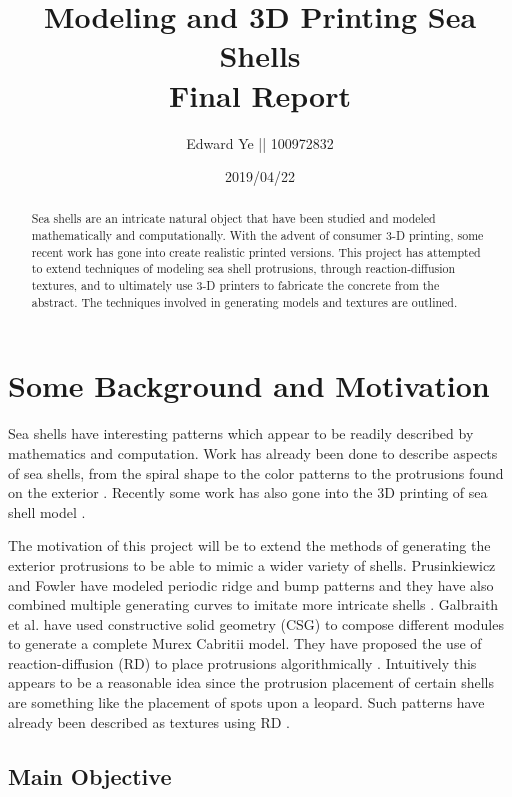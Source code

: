 \documentclass[a4paper]{article}
\title{Modeling and 3D Printing Sea Shells\\
		\large Final Report}
\author{Edward Ye || 100972832}
\date{2019/04/22}
\begin{document}
\maketitle

\begin{abstract}
	Sea shells are an intricate natural object that have been studied and modeled mathematically and computationally. With the advent of consumer 3-D printing, some recent work has gone into create realistic printed versions. This project has attempted to extend techniques of modeling sea shell protrusions, through reaction-diffusion textures, and to ultimately use 3-D printers to fabricate the concrete from the abstract. The techniques involved in generating models and textures are outlined.
\end{abstract}

\tableofcontents

\section{Some Background and Motivation}

Sea shells have interesting patterns which  appear to be readily described by mathematics and computation. Work has already been done to describe aspects of sea shells, from the spiral shape to the color patterns to the protrusions found on the exterior \cite{Galbraith00modelingmurex}\cite{abss}\cite{VANDERHELM1998505}. Recently some work has also gone into the 3D printing of sea shell model \cite{3dprinting-seashells}\cite{bachman-3dprinting}.

The motivation of this project will be to extend the methods of generating the exterior protrusions to be able to mimic a wider variety of shells. Prusinkiewicz and Fowler have modeled periodic ridge and bump patterns and they have also combined multiple generating curves to imitate more intricate shells \cite{abss}. Galbraith et al. have used constructive solid geometry (CSG) to compose different modules to generate a complete Murex Cabritii model. They have proposed the use of reaction-diffusion (RD) to place protrusions algorithmically \cite{Galbraith00modelingmurex}. Intuitively this appears to be a reasonable idea since the protrusion placement of certain shells are something like the placement of spots upon a leopard. Such patterns have already been described as textures using RD \cite{Turk:1991:GTA:127719.122749}.

\pagebreak

\subsection{Main Objective}
\end{document}
